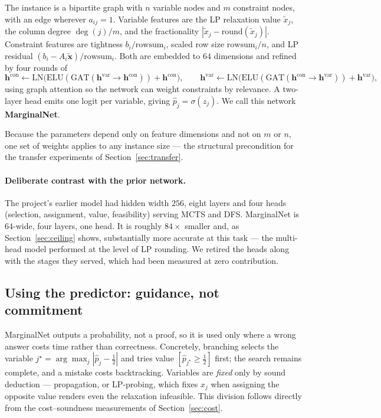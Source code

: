 \documentclass[12pt]{article}
\begin{document}
The instance is a bipartite graph with $n$ variable nodes and $m$ constraint nodes, with an edge wherever $a_{ij}=1$. Variable features are the LP relaxation value $\tilde{x}_j$, the column degree $\deg(j)/m$, and the fractionality $|\tilde{x}_j-\mathrm{round}(\tilde{x}_j)|$. Constraint features are tightness $b_i/\mathrm{rowsum}_i$, scaled row size $\mathrm{rowsum}_i/n$, and LP residual $(b_i-A_i\tilde{\mathbf{x}})/\mathrm{rowsum}_i$. Both are embedded to $64$ dimensions and refined by four rounds of
\begin{equation}
\mathbf{h}^{\mathrm{con}} \leftarrow \mathrm{LN}\big(\mathrm{ELU}(\mathrm{GAT}(\mathbf{h}^{\mathrm{var}}\!\to\!\mathbf{h}^{\mathrm{con}}))+\mathbf{h}^{\mathrm{con}}\big),\qquad
\mathbf{h}^{\mathrm{var}} \leftarrow \mathrm{LN}\big(\mathrm{ELU}(\mathrm{GAT}(\mathbf{h}^{\mathrm{con}}\!\to\!\mathbf{h}^{\mathrm{var}}))+\mathbf{h}^{\mathrm{var}}\big),
\end{equation}
using graph attention \citep{velickovic2018graph} so the network can weight constraints by relevance. A two-layer head emits one logit per variable, giving $\hat{p}_j=\sigma(z_j)$. We call this network \textbf{MarginalNet}.

Because the parameters depend only on feature dimensions and not on $m$ or $n$, one set of weights applies to any instance size --- the structural precondition for the transfer experiments of Section~\ref{sec:transfer}.

\paragraph{Deliberate contrast with the prior network.} The project's earlier model had hidden width $256$, eight layers and four heads (selection, assignment, value, feasibility) serving MCTS and DFS. MarginalNet is $64$-wide, four layers, one head. It is roughly $84\times$ smaller and, as Section~\ref{sec:ceiling} shows, substantially more accurate at this task --- the multi-head model performed at the level of LP rounding. We retired the heads along with the stages they served, which had been measured at zero contribution.

\subsection{Using the predictor: guidance, not commitment}
\label{sec:m-search}

MarginalNet outputs a probability, not a proof, so it is used only where a wrong answer costs time rather than correctness. Concretely, branching selects the variable $j^\star=\arg\max_j |\hat{p}_j-\tfrac12|$ and tries value $[\hat{p}_{j^\star}\ge\tfrac12]$ first; the search remains complete, and a mistake costs backtracking. Variables are \emph{fixed} only by sound deduction --- propagation, or LP-probing, which fixes $x_j$ when assigning the opposite value renders even the relaxation infeasible. This division follows directly from the cost--soundness measurements of Section~\ref{sec:cost}.
\end{document}
